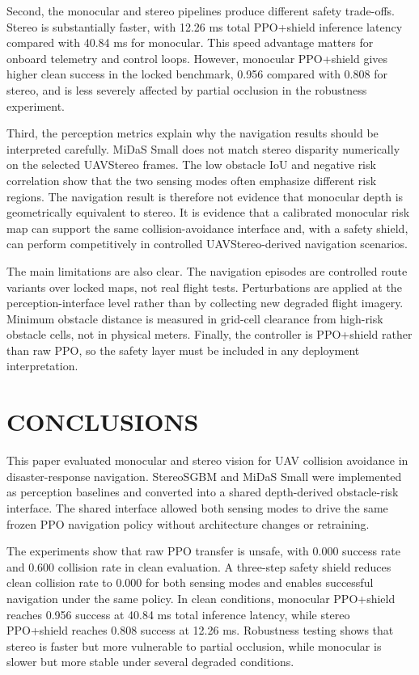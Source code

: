 \documentclass[12pt]{article}
\begin{document}
Second, the monocular and stereo pipelines produce different safety trade-offs. Stereo is substantially faster, with 12.26 ms total PPO+shield inference latency compared with 40.84 ms for monocular. This speed advantage matters for onboard telemetry and control loops. However, monocular PPO+shield gives higher clean success in the locked benchmark, 0.956 compared with 0.808 for stereo, and is less severely affected by partial occlusion in the robustness experiment.

Third, the perception metrics explain why the navigation results should be interpreted carefully. MiDaS Small does not match stereo disparity numerically on the selected UAVStereo frames. The low obstacle IoU and negative risk correlation show that the two sensing modes often emphasize different risk regions. The navigation result is therefore not evidence that monocular depth is geometrically equivalent to stereo. It is evidence that a calibrated monocular risk map can support the same collision-avoidance interface and, with a safety shield, can perform competitively in controlled UAVStereo-derived navigation scenarios.

The main limitations are also clear. The navigation episodes are controlled route variants over locked maps, not real flight tests. Perturbations are applied at the perception-interface level rather than by collecting new degraded flight imagery. Minimum obstacle distance is measured in grid-cell clearance from high-risk obstacle cells, not in physical meters. Finally, the controller is PPO+shield rather than raw PPO, so the safety layer must be included in any deployment interpretation.

\section{\MakeUppercase{Conclusions}}

\noindent
This paper evaluated monocular and stereo vision for UAV collision avoidance in disaster-response navigation. StereoSGBM and MiDaS Small were implemented as perception baselines and converted into a shared depth-derived obstacle-risk interface. The shared interface allowed both sensing modes to drive the same frozen PPO navigation policy without architecture changes or retraining.

The experiments show that raw PPO transfer is unsafe, with 0.000 success rate and 0.600 collision rate in clean evaluation. A three-step safety shield reduces clean collision rate to 0.000 for both sensing modes and enables successful navigation under the same policy. In clean conditions, monocular PPO+shield reaches 0.956 success at 40.84 ms total inference latency, while stereo PPO+shield reaches 0.808 success at 12.26 ms. Robustness testing shows that stereo is faster but more vulnerable to partial occlusion, while monocular is slower but more stable under several degraded conditions.
\end{document}

